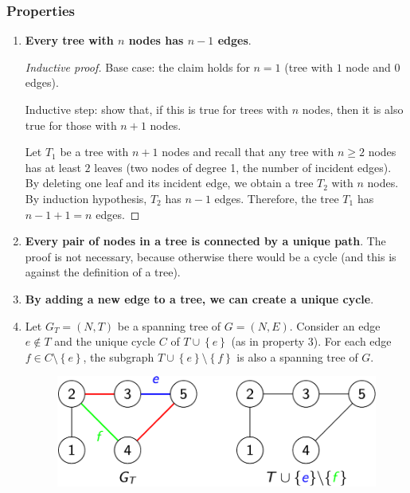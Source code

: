 \newpage

\subsubsection{Properties}

\begin{enumerate}
    \item \textbf{Every tree with $n$ nodes has $n-1$ edges}.
    \begin{proof}[Inductive proof]
        Base case: the claim holds for $n=1$ (tree with $1$ node and $0$ edges).

        Inductive step: show that, if this is true for trees with $n$ nodes, then it is also true for those with $n+1$ nodes.

        Let $T_{1}$ be a tree with $n+1$ nodes and recall that any tree with $n \ge 2$ nodes has at least $2$ leaves (two nodes of degree 1, the number of incident edges). By deleting one leaf and its incident edge, we obtain a tree $T_{2}$ with $n$ nodes. By induction hypothesis, $T_{2}$ has $n-1$ edges. Therefore, the tree $T_{1}$ has $n-1+1 = n$ edges.
    \end{proof}

    \item \textbf{Every pair of nodes in a tree is connected by a unique path}. The proof is not necessary, because otherwise there would be a cycle (and this is against the definition of a tree).

    \item \textbf{By adding a new edge to a tree, we can create a unique cycle}.

    \item Let $G_{T} = \left(N,T\right)$ be a spanning tree of $G = \left(N,E\right)$. Consider an edge $e \notin T$ and the unique cycle $C$ of $T \cup \left\{e\right\}$ (as in property 3). For each edge $f \in C \setminus \left\{e\right\}$, the subgraph $T \cup \left\{e\right\} \setminus \left\{f\right\}$ is also a spanning tree of $G$.
    \begin{figure}[!htp]
        \centering
        \includegraphics[width=.5\textwidth]{img/trees-5.pdf}
    \end{figure}


\end{enumerate}

